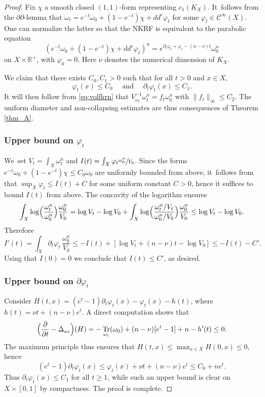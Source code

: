 \documentclass[11pt]{article}
\numberwithin{equation}{section}
\DeclareMathOperator{\Tr}{Tr}
\theoremstyle{definition}
\newcommand{\R}{\mathbb R}
\let\f\varphi
\begin{document}
\begin{proof}
Fix $\chi$ a smooth closed $(1,1)$-form representing $c_1(K_X)$. It~follows from the $\partial\overline{\partial}$-lemma
that $\omega_t=e^{-t}\omega_0+(1-e^{-t}) \chi+dd^c \f_t$ for some $\f_t \in {\mathcal C}^{\infty}(X)$. One can normalize
the latter so that the NKRF is equivalent to the parabolic equation
\[
(e^{-t}\omega_0+(1-e^{-t}) \chi+dd^c \f_t)^n=e^{\partial_t \f_t+\f_t-(n-\nu)t} \omega_0^n
\]
on $X \times \R^+$, with $\f_0=0$. Here $\nu$ denotes the numerical dimension of $K_X$.

We claim that there exists $C_0,C_1>0$ such that for all $t>0$ and $x \in X$,
\[
\f_t(x) \leq C_0
\quad \text{ and } \quad
\partial_t \f_t(x) \leq C_1.
\]
It will then follow from \eqref{eq:volfkrn} that $V_{\omega_t}^{-1}\omega_t^n=f_t \omega_0^n$ with
$\|f_t\|_{\infty} \leq C_2$. The uniform diameter and non-collapsing estimates are thus consequences
of Theorem \ref{thm_A}.

\subsubsection*{Upper bound on $\f_t$}
We~set $V_t=\int_X \omega_t^n$ and $I(t)=\int_X \f_t \sfrac{\omega_0^n}{V_0}$.
Since the forms $e^{-t} \omega_0 +(1-e^{-t}) \chi \leq C_0 \omega_0$
are uniformly bounded from above, it~follows from \cite[Prop.\,8.5]{GZbook} that
$\sup_X \f_t \leq I(t)+C$ for some uniform constant $C>0$, hence it suffices to bound
$I(t)$ from above. The concavity of the logarithm ensures
\[
\int_X \log \Bigl( \frac{\omega_t^n}{\omega_0^n} \Bigr) \frac{\omega_0^n}{V_0}
=\log V_t-\log V_0 + \int_X \log \Bigl( \frac{\omega_t^n/V_t}{\omega_0^n/V_0} \Bigr) \frac{\omega_0^n}{V_0}
\leq \log V_t-\log V_0.
\]
Therefore
\[
I'(t)=\int_X \partial_t \f_t\, \frac{\omega_0^n}{V_0} \leq -I(t)+
[\log V_t+(n-\nu)t-\log V_0]\leq -I(t)-C'.
\]
Using that $I(0)=0$ we conclude that $I(t) \leq C'$, as desired.

\subsubsection*{Upper bound on $\partial\f_t$}
Consider $H(t,x)=(e^t-1) \partial_t \f_t(x)-\f_t(x)-h(t)$, where
$h(t)=\nu t+(n-\nu)e^t$. A direct computation shows that
\[
\Bigl( \frac{\partial}{\partial t}-\Delta_{\omega_t} \Bigr)(H)=-\Tr_{\omega_t}(\omega_0)
+(n-\nu)[e^t-1] +n-h'(t) \leq 0.
\]
The maximum principle thus ensures that $H(t,x) \leq \max_{x \in X} H(0,x) \leq 0$, hence
\[
(e^t-1) \partial_t \f_t(x) \leq \f_t(x)+\nu t +(n-\nu)e^t \leq C_0+ne^t.
\]
Thus $\partial_t \f_t(x) \leq C_1$ for all $t \geq 1$, while such an upper bound is
clear on $X \times [0,1]$ by compactness.
The proof is complete.
\end{proof}
\end{document}
